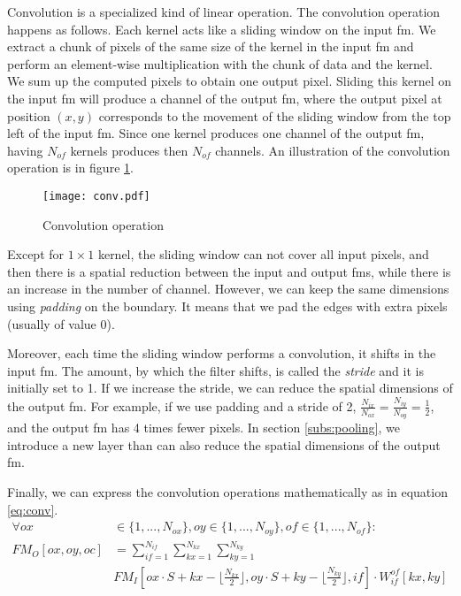 Convolution is a specialized kind of linear operation. The convolution operation happens as follows. Each kernel acts like a sliding window on the input \acrshort{fm}. We extract a chunk of pixels of the same size of the kernel in the input \acrshort{fm} and perform an element-wise multiplication with the chunk of data and the kernel. We sum up the computed pixels to obtain one output pixel. Sliding this kernel on the input \acrshort{fm} will produce a channel of the output \acrshort{fm}, where the output pixel at position $(x, y)$ corresponds to the movement of the sliding window from the top left of the input \acrshort{fm}. Since one kernel produces one channel of the output \acrshort{fm}, having $N_{of}$ kernels produces then $N_{of}$ channels. An illustration of the convolution operation is in figure \ref{fig:convolution}.
%
\begin{figure}
    \centering
    \texttt{[image: conv.pdf]}
    \caption{Convolution operation}
    \label{fig:convolution}
\end{figure}

Except for $1 \times 1$ kernel, the sliding window can not cover all input pixels, and then there is a spatial reduction between the input and output \acrshort{fm}s, while there is an increase in the number of channel. However, we can keep the same dimensions using \textit{padding} on the boundary. It means that we pad the edges with extra pixels (usually of value 0).

Moreover, each time the sliding window performs a convolution, it shifts in the input \acrshort{fm}. The amount, by which the filter shifts, is called the \textit{stride} and it is initially set to 1. If we increase the stride, we can reduce the spatial dimensions of the output \acrshort{fm}. For example, if we use padding and a stride of 2, $\frac{N_{ix}}{N_{ox}} = \frac{N_{iy}}{N_{oy}} = \frac{1}{2}$, and the output \acrshort{fm} has 4 times fewer pixels. In section \ref{subs:pooling}, we introduce a new layer than can also reduce the spatial dimensions of the output \acrshort{fm}.

Finally, we can express the convolution operations mathematically as in equation \eqref{eq:conv}.
%
\begin{equation}
    \begin{split}
        \forall ox &\in \{ 1, ..., N_{ox} \}, oy \in \{ 1, ..., N_{oy} \}, of \in \{ 1, ..., N_{of} \} : \\
        FM_O[ox, oy, oc] &= \sum^{N_{if}}_{if=1}
        \sum^{N_{kx}}_{kx=1}
        \sum^{N_{ky}}_{ky=1} \\
        &FM_I[ox \cdot S + kx - \lfloor \frac{N_{kx}}{2} \rfloor,  oy \cdot S + ky - \lfloor \frac{N_{ky}}{2} \rfloor, if] \cdot
        W^{of}_{if}[kx, ky]
    \end{split}
    \label{eq:conv}
\end{equation}

